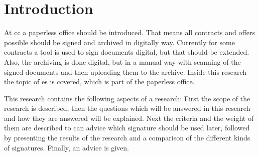 \section{Introduction}

At \gls{cc} a paperless office should be introduced. That means all contracts and offers possible should be signed and archived in digitally way. Currently for some contracts a tool is used to sign documents digital, but that should be extended. Also, the archiving is done digital, but in a manual way with scanning of the signed documents and then uploading them to the archive. Inside this research the topic of \gls{es} is covered, which is part of the paperless office.

This research contains the following aspects of a research: First the scope of the research is described, then the questions which will be answered in this research and how they are answered will be explained. Next the criteria and the weight of them are described to can advice which signature should be used later, followed by presenting the results of the research and a comparison of the different kinds of signatures. Finally, an advice is given.  